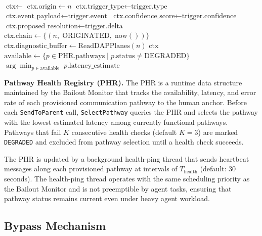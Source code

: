 \begin{algorithm}[htbp]
\begin{algorithmic}[1]
  \State \Return {}
\EndProcedure
\\[4pt]
  \State $\text{ctx} \leftarrow$ 
  \State $\text{ctx.origin} \leftarrow n$
  \State $\text{ctx.trigger\_type} \leftarrow \text{trigger.type}$
  \State $\text{ctx.event\_payload} \leftarrow \text{trigger.event}$
  \State $\text{ctx.confidence\_score} \leftarrow \text{trigger.confidence}$
  \State $\text{ctx.proposed\_resolution} \leftarrow \text{trigger.delta}$
  \State $\text{ctx.chain} \leftarrow \{(n,\;\text{ORIGINATED},\;\text{now}())\}$
  \State $\text{ctx.diagnostic\_buffer} \leftarrow \text{ReadDAPPlanes}(n)$
  \State \Return $\text{ctx}$
\EndFunction
\\[4pt]
  \State $\text{available} \leftarrow \{p \in \text{PHR.pathways} \mid p.\text{status} \neq \text{DEGRADED}\}$
  \State \Return $\arg\min_{p \in \text{available}} \; p.\text{latency\_estimate}$
\EndFunction
\end{algorithmic}
\end{algorithm}

\bigskip
\noindent\textbf{Pathway Health Registry (PHR).} The PHR is a runtime data structure maintained by the Bailout Monitor that tracks the availability, latency, and error rate of each provisioned communication pathway to the human anchor. Before each \texttt{SendToParent} call, \texttt{SelectPathway} queries the PHR and selects the pathway with the lowest estimated latency among currently functional pathways. Pathways that fail $K$ consecutive health checks (default $K = 3$) are marked \texttt{DEGRADED} and excluded from pathway selection until a health check succeeds.

The PHR is updated by a background health-ping thread that sends heartbeat messages along each provisioned pathway at intervals of $T_{\text{health}}$ (default: 30 seconds). The health-ping thread operates with the same scheduling priority as the Bailout Monitor and is not preemptible by agent tasks, ensuring that pathway status remains current even under heavy agent workload.

\subsection{Bypass Mechanism}\label{sec:bypass}

